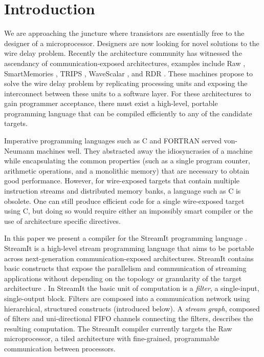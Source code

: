 \section{Introduction}

We are approaching the juncture where transistors are essentially free
to the designer of a microprocessor.  Designers are now looking for
novel solutions to the wire delay problem. Recently the architecture
community has witnessed the ascendancy of communication-exposed
architectures, examples include Raw
\cite{raw, raw_isca}, SmartMemories \cite{smartmemories}, TRIPS \cite{trips},
WaveScalar \cite{wavescalar}, and RDR \cite{rdr}.  These
machines propose to solve the wire delay problem by replicating
processing units and exposing the interconnect between these units to
a software layer.  For these architectures to gain programmer
acceptance, there must exist a high-level, portable programming
language that can be compiled efficiently to any of the candidate
targets.  

Imperative programming languages such as C and FORTRAN served
von-Neumann machines well.  They abstracted away the idiosyncrasies of
a machine while encapsulating the common properties (such as a single
program counter, arithmetic operations, and a monolithic memory) that
are necessary to obtain good performance.  However, for wire-exposed
targets that contain multiple instruction streams and distributed
memory banks, a language such as C is obsolete.  One can
still produce efficient code for a single wire-exposed target using C,
but doing so would require either an impossibly smart compiler or the use
of architecture specific directives.  

In this paper we present a compiler for the StreamIt programming
language \cite{streamitcc}.  StreamIt is a high-level stream
programming language that aims to be portable across next-generation
communication-exposed architectures.  StreamIt contains basic
constructs that expose the parallelism and communication of streaming
applications without depending on the topology or granularity of the
target architecture \cite{streamit-asplos}. In StreamIt the basic unit
of computation is a {\it filter}, a single-input, single-output block.
Filters are composed into a communication network using hierarchical,
structured constructs (introduced below).  A {\it stream graph},
composed of filters and uni-directional FIFO channels connecting the
filters, describes the resulting computation. The StreamIt compiler
currently targets the Raw microprocessor, a tiled architecture with
fine-grained, programmable communication between processors.

